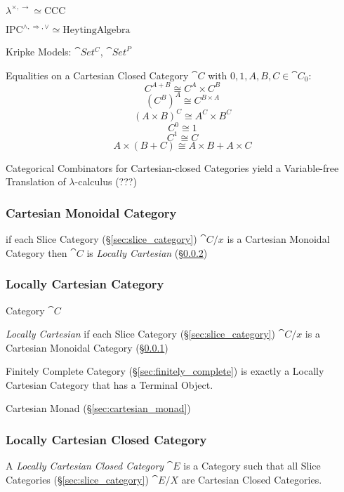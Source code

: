 $\lambda^{\times, \rightarrow} \simeq \mathrm{CCC}$

$\mathrm{IPC}^{\wedge, \Rightarrow, \vee} \simeq \mathrm{Heyting Algebra}$

Kripke Models: $\cat{Set^C}$, $\cat{Set}^P$ %

Equalities on a Cartesian Closed Category $\cat{C}$ with
$0,1,A,B,C \in \cat{C}_0$:
\[
  C^{A + B} \cong C^A \times C^B
\]\[
  (C^B)^A \cong C^{B \times A}
\]\[
  (A \times B)^C \cong A^C \times B^C
\]\[
  C^0 \cong 1
\]\[
  C^1 \cong C
\]\[
  A \times (B + C) \cong A \times B + A \times C
\]

Categorical Combinators for Cartesian-closed Categories yield a
Variable-free Translation of $\lambda$-calculus (???)



\subsubsection{Cartesian Monoidal Category}
\label{sec:cartesian_monoidal}

if each Slice Category (\S\ref{sec:slice_category}) $\cat{C}/x$ is a
Cartesian Monoidal Category then $\cat{C}$ is \emph{Locally Cartesian}
(\S\ref{sec:locally_cartesian})



\subsubsection{Locally Cartesian Category}\label{sec:locally_cartesian}

Category $\cat{C}$

\emph{Locally Cartesian} if each Slice Category
(\S\ref{sec:slice_category}) $\cat{C}/x$ is a Cartesian Monoidal
Category (\S\ref{sec:cartesian_monoidal})

Finitely Complete Category (\S\ref{sec:finitely_complete}) is exactly
a Locally Cartesian Category that has a Terminal Object.

Cartesian Monad (\S\ref{sec:cartesian_monad})



\subsubsection{Locally Cartesian Closed Category}
\label{sec:locally_cartesian_closed}

A \emph{Locally Cartesian Closed Category} $\cat{E}$ is a Category
such that all Slice Categories (\S\ref{sec:slice_category})
$\cat{E}/X$ are Cartesian Closed Categories.


